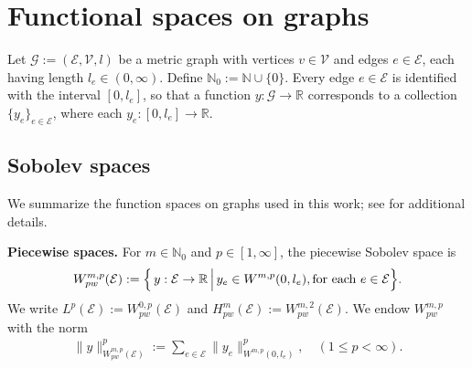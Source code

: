 \documentclass[a4paper, 10pt, english]{article}
\def\to{\rightarrow}
\begin{document}
\appendix

\section{Functional spaces on graphs}\label{appendix1}

Let $\mathcal{G} := (\mathcal{E}, \mathcal{V}, l)$ be a metric graph with vertices $v \in \mathcal{V}$ and edges $e \in \mathcal{E}$, each having length $l_e \in (0,\infty)$. Define $\mathbb{N}_0 := \mathbb{N} \cup \{0\}$. Every edge $e \in \mathcal{E}$ is identified with the interval $[0,l_e]$, so that a function $y:\mathcal{G}\to\mathbb{R}$ corresponds to a collection $\{y_e\}_{e\in\mathcal{E}}$, where each $y_e:[0,l_e]\to\mathbb{R}$.

\subsection{Sobolev spaces}

We summarize the function spaces on graphs used in this work; see \cite[Chapter 3]{Mugnolo} for additional details.
\smallbreak

\noindent
\textbf{Piecewise spaces.} For $m \in \mathbb{N}_0$ and $p \in [1,\infty]$, the piecewise Sobolev space is
\[
W_{pw}^{m,p}(\mathcal{E})
:=
\Bigl\{\,y:\mathcal{E}\to\mathbb{R} \,\Big|\,
y_e \in W^{m,p}(0,l_e),\text{for each }e\in\mathcal{E}\Bigr\}.
\]
We write $L^p(\mathcal{E}):=W_{pw}^{0,p}(\mathcal{E})$ and $H_{pw}^m(\mathcal{E}) := W_{pw}^{m,2}(\mathcal{E})$. We endow $W_{pw}^{m,p}$ with the norm
\begin{align}
\|y\|_{W_{pw}^{m,p}(\mathcal{E})}^p
:=
\sum_{e\in\mathcal{E}}
\bigl\|y_e\bigr\|_{W^{m,p}(0,l_e)}^p,
\quad (1 \le p < \infty).
\end{align}
\end{document}
